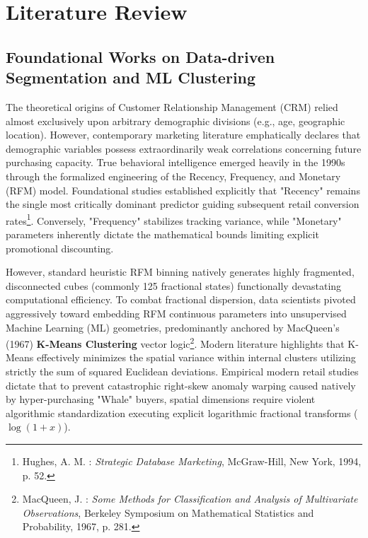 \documentclass[12pt,a4paper]{report}
\begin{document}
\setcounter{chapter}{1} %
\setcounter{section}{1} %

\section{Literature Review}

\subsection{Foundational Works on Data-driven Segmentation and ML Clustering}
The theoretical origins of Customer Relationship Management (CRM) relied almost exclusively upon arbitrary demographic divisions (e.g., age, geographic location). However, contemporary marketing literature emphatically declares that demographic variables possess extraordinarily weak correlations concerning future purchasing capacity. True behavioral intelligence emerged heavily in the 1990s through the formalized engineering of the Recency, Frequency, and Monetary (RFM) model. Foundational studies established explicitly that "Recency" remains the single most critically dominant predictor guiding subsequent retail conversion rates\footnote{Hughes, A. M. : \textit{Strategic Database Marketing}, McGraw-Hill, New York, 1994, p. 52.}. Conversely, "Frequency" stabilizes tracking variance, while "Monetary" parameters inherently dictate the mathematical bounds limiting explicit promotional discounting.

However, standard heuristic RFM binning natively generates highly fragmented, disconnected cubes (commonly 125 fractional states) functionally devastating computational efficiency. To combat fractional dispersion, data scientists pivoted aggressively toward embedding RFM continuous parameters into unsupervised Machine Learning (ML) geometries, predominantly anchored by MacQueen’s (1967) \textbf{K-Means Clustering} vector logic\footnote{MacQueen, J. : \textit{Some Methods for Classification and Analysis of Multivariate Observations}, Berkeley Symposium on Mathematical Statistics and Probability, 1967, p. 281.}. 
Modern literature highlights that K-Means effectively minimizes the spatial variance within internal clusters utilizing strictly the sum of squared Euclidean deviations. Empirical modern retail studies dictate that to prevent catastrophic right-skew anomaly warping caused natively by hyper-purchasing "Whale" buyers, spatial dimensions require violent algorithmic standardization executing explicit logarithmic fractional transforms ($\log(1+x)$).
\end{document}

